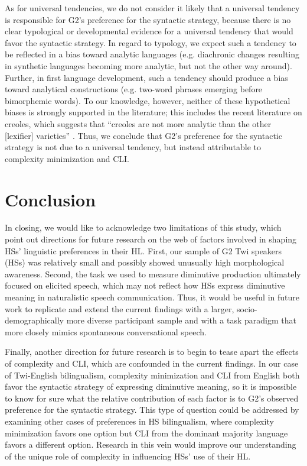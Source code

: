 \documentclass[output=paper,colorlinks,citecolor=brown]{langscibook}
\begin{document}
As for universal tendencies, we do not consider it likely that a universal tendency is responsible for G2's preference for the syntactic strategy, because there is no clear typological or developmental evidence for a universal tendency that would favor the syntactic strategy. In regard to typology, we expect such a tendency to be reflected in a bias toward analytic languages (e.g. diachronic changes resulting in synthetic languages becoming more analytic, but not the other way around). Further, in first language development, such a tendency should produce a bias toward analytical constructions (e.g. two-word phrases emerging before bimorphemic words). To our knowledge, however, neither of these hypothetical biases is strongly supported in the literature; this includes the recent literature on creoles, which suggests that ``creoles are not more analytic than the other [lexifier] varieties'' \citep[49]{SiegelSzmrecsanyiKortmann2014}. Thus, we conclude that G2's preference for the syntactic strategy is not due to a universal tendency, but instead attributable to complexity minimization and CLI.

\section{Conclusion}
\label{ConclusionSec}

In closing, we would like to acknowledge two limitations of this study, which point out directions for future research on the web of factors involved in shaping HSs' linguistic preferences in their HL. First, our sample of G2 Twi speakers (HSs) was relatively small and possibly showed unusually high morphological awareness. Second, the task we used to measure diminutive production ultimately focused on elicited speech, which may not reflect how HSs express diminutive meaning in naturalistic speech communication. Thus, it would be useful in future work to replicate and extend the current findings with a larger, socio-demographically more diverse participant sample and with a task paradigm that more closely mimics spontaneous conversational speech.

Finally, another direction for future research is to begin to tease apart the effects of complexity and CLI, which are confounded in the current findings. In our case of Twi-English bilingualism, complexity minimization and CLI from English both favor the syntactic strategy of expressing diminutive meaning, so it is impossible to know for sure what the relative contribution of each factor is to G2's observed preference for the syntactic strategy. This type of question could be addressed by examining other cases of preferences in HS bilingualism, where complexity minimization favors one option but CLI from the dominant majority language favors a different option. Research in this vein would improve our understanding of the unique role of complexity in influencing HSs' use of their HL.
\end{document}
